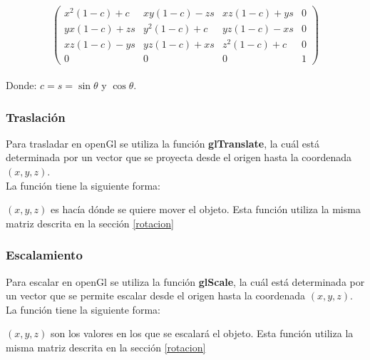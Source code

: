 \documentclass[12pt,journal,compsoc]{IEEEtran}
\begin{document}
\[
	\left( 
		\begin{array}{cccc}
			x^{2}(1-c)+c & xy(1-c)-zs & xz(1-c)+ys & 0 \\
			yx(1-c)+zs & y^{2}(1-c)+c & yz(1-c)-xs & 0 \\
			xz(1-c)-ys & yz(1-c)+xs & z^{2}(1-c)+c & 0 \\
			0 & 0 & 0 & 1
		\end{array}
	\right)
\]\\

Donde: $c = s=\sin\theta$ y $\cos\theta$.
\subsubsection{Traslación}
Para trasladar en openGl se utiliza la función \textbf{glTranslate}, la cuál está determinada por un vector que se proyecta desde el origen hasta la coordenada $(x,y,z)$.\\La función tiene la siguiente forma:
%
 
%
$(x,y,z)$ es hacía dónde se quiere mover el objeto. Esta función utiliza la misma matriz descrita en la sección \ref{rotacion}
\subsubsection{Escalamiento}
Para escalar en openGl se utiliza la función \textbf{glScale}, la cuál está determinada por un vector que se permite escalar desde el origen hasta la coordenada $(x,y,z)$.\\La función tiene la siguiente forma:
%
 
%
$(x,y,z)$ son los valores en los que se escalará el objeto. Esta función utiliza la misma matriz descrita en la sección \ref{rotacion}
\end{document}
